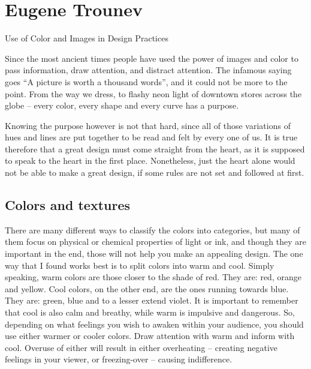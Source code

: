 
\chapter{Eugene Trounev}{Use of Color and Images in Design Practices}

Since the most ancient times people have used the power of images and color to
pass information, draw attention, and distract attention. The infamous
saying goes ``A picture is worth a thousand words'', and it could not be more to
the point. From the way we dress, to flashy neon light of downtown stores across
the globe -- every color, every shape and every curve has a purpose.

Knowing the purpose however is not that hard, since all of those variations of
hues and lines are put together to be read and felt by every one of us. It is
true therefore that a great design must come straight from the heart, as it is
supposed to speak to the heart in the first place. Nonetheless, just the heart
alone would not be able to make a great design, if some rules are not set and
followed at first.

\section*{Colors and textures}

There are many different ways to classify the colors into categories, but many of
them focus on physical or chemical properties of light or ink, and though they are
important in the end, those will not help you make an appealing design. The one way
that I found works best is to split colors into warm and cool. Simply speaking,
warm colors are those closer to the shade of red. They are: red, orange and
yellow. Cool colors, on the other end, are the ones running towards blue. They are: green,
blue and to a lesser extend violet. It is important to remember that cool is
also calm and breathy, while warm is impulsive and dangerous. So, depending on
what feelings you wish to awaken within your audience, you should use either
warmer or cooler colors. Draw attention with warm and inform with cool.
Overuse of either will result in either overheating -- creating negative feelings
in your viewer, or freezing-over -- causing indifference.

